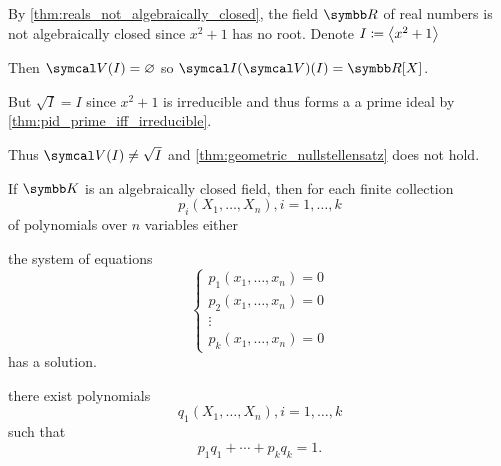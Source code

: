 \begin{example}\label{ex:geometric_nullstellensatz_does_not_hold_for_reals}
  By \cref{thm:reals_not_algebraically_closed}, the field \( \R \) of real numbers is not algebraically closed since \( x^2 + 1 \) has no root. Denote \( I \coloneqq \left\langle x^2 + 1 \right\rangle \)

  Then \( \Cal{V}(I) = \varnothing \) so \( \Cal{I}(\Cal{V})(I) = \R[X] \).

  But \( \sqrt{I} = I \) since \( x^2 + 1 \) is irreducible and thus forms a a prime ideal by \cref{thm:pid_prime_iff_irreducible}.

  Thus \( \Cal{V}(I) \neq \sqrt{I} \) and \cref{thm:geometric_nullstellensatz} does not hold.
\end{example}

\begin{corollary}\label{thm:weak_nullstellensatz}\cite{Tao:nullstellensatz}
  If \( \K \) is an algebraically closed field, then for each finite collection
  \begin{equation*}
    p_i(X_1, \ldots, X_n), i = 1, \ldots, k
  \end{equation*}
  of polynomials over \( n \) variables either
  \begin{itemize}
     the system of equations
    \begin{equation}\label{thm:weak_nullstellensatz/system}
      \begin{cases}
        p_1(x_1, \ldots, x_n) = 0 \\
        p_2(x_1, \ldots, x_n) = 0 \\
        \vdots \\
        p_k(x_1, \ldots, x_n) = 0
      \end{cases}
    \end{equation}
    has a solution.

     there exist polynomials
    \begin{equation*}
      q_1(X_1, \ldots, X_n), i = 1, \ldots, k
    \end{equation*}
    such that
    \begin{equation*}
      p_1 q_1 + \cdots + p_k q_k = 1.
    \end{equation*}
  \end{itemize}
\end{corollary}
